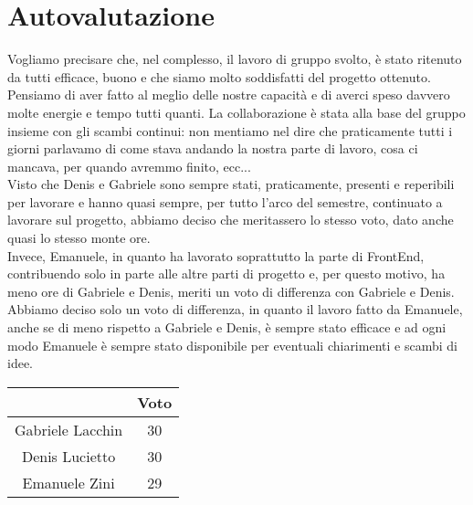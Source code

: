 \documentclass{article}
\begin{document}
\section{Autovalutazione}

Vogliamo precisare che, nel complesso, il lavoro di gruppo svolto, è stato ritenuto da tutti efficace, buono e che siamo molto soddisfatti del progetto ottenuto. Pensiamo di aver fatto al meglio delle nostre capacità e di averci speso davvero molte energie e tempo tutti quanti. La collaborazione è stata alla base del gruppo insieme con gli scambi continui: non mentiamo nel dire che praticamente tutti i giorni parlavamo di come stava andando la nostra parte di lavoro, cosa ci mancava, per quando avremmo finito, ecc... \\
Visto che Denis e Gabriele sono sempre stati, praticamente, presenti e reperibili per lavorare e hanno quasi sempre, per tutto l'arco del semestre, continuato a lavorare sul progetto, abbiamo deciso che meritassero lo stesso voto, dato anche quasi lo stesso monte ore. \\
Invece, Emanuele, in quanto ha lavorato soprattutto la parte di FrontEnd, contribuendo solo in parte alle altre parti di progetto e, per questo motivo, ha meno ore di Gabriele e Denis, meriti un voto di differenza con Gabriele e Denis. Abbiamo deciso solo un voto di differenza, in quanto il lavoro fatto da Emanuele, anche se di meno rispetto a Gabriele e Denis, è sempre stato efficace e ad ogni modo Emanuele è sempre stato disponibile per eventuali chiarimenti e scambi di idee.

\begin{center}
    \begin{tabular}{|c|c|}
        \hline
                         & Voto \\
        \hline
        Gabriele Lacchin & 30   \\
        \hline
        Denis Lucietto   & 30   \\
        \hline
        Emanuele Zini    & 29   \\
        \hline
    \end{tabular}
\end{center}
\end{document}
